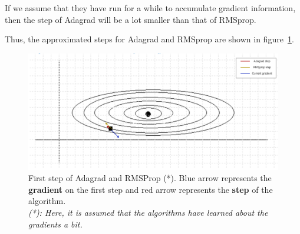If we assume that they have run for a while to accumulate gradient
information, then the step of Adagrad will be a lot smaller than that of RMSprop.

Thus, the approximated steps for Adagrad and RMSprop are shown in figure~\ref{fig:prob9_contour_adagrad_rmsprop}.

\begin{figure}[H]
	\centering
	\includegraphics[width=.7\textwidth]{../Problem 9/contour_adagrad_rmsprop.png}
	\caption{First step of Adagrad and RMSProp (*). Blue arrow represents the \textbf{gradient} on the first step and red arrow represents the \textbf{step} of the algorithm.\\
	\textit{\small(*): Here, it is assumed that the algorithms have learned about the gradients a bit.}
	}
	\label{fig:prob9_contour_adagrad_rmsprop}
\end{figure}
